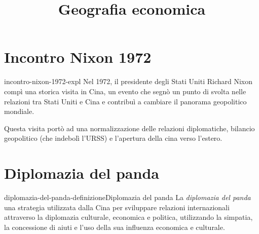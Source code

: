 \documentclass[preview]{standalone}
\begin{document}
\title{Geografia economica}
\genpage

\section{Incontro Nixon 1972}

\begin{snippet}{incontro-nixon-1972-expl}
    Nel 1972, il presidente degli Stati Uniti Richard Nixon compì
    una storica visita in Cina, un evento che segnò un punto di svolta nelle
    relazioni tra Stati Uniti e Cina e contribuì a cambiare il panorama geopolitico mondiale.

    Questa visita portò ad una normalizzazione delle relazioni diplomatiche,
    bilancio geopolitico (che indebolì l'URSS) e l'apertura della cina verso l'estero.
\end{snippet}

\section{Diplomazia del panda}

\begin{snippetdefinition}{diplomazia-del-panda-definizione}{Diplomazia del panda}
    La \textit{diplomazia del panda}  una strategia utilizzata dalla Cina per sviluppare relazioni internazionali attraverso la diplomazia culturale, economica e politica, utilizzando la simpatia, la concessione di aiuti e l'uso della sua influenza economica e culturale.
\end{snippetdefinition}
\end{document}
